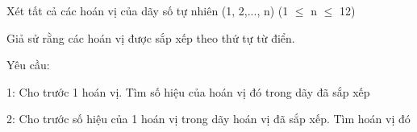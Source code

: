 Xét tất cả các hoán vị của dãy số tự nhiên (1, 2,..., n) (1  $\le$  n  $\le$  12)  

   Giả sử rằng các hoán vị được sắp xếp theo thứ tự từ điển.  

   Yêu cầu:  

   1: Cho trước 1 hoán vị. Tìm số hiệu của hoán vị đó trong dãy đã sắp xếp  

   2: Cho trước số hiệu của 1 hoán vị trong dãy hoán vị đã sắp xếp. Tìm hoán vị đó  

\